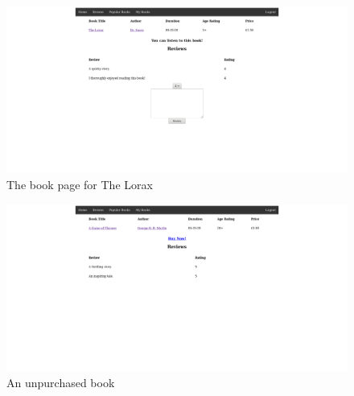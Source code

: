 \documentclass{article}
\begin{document}
\begin{figure}[!htb]
  \caption{The book page for The Lorax}
  \center
  \includegraphics[scale=0.19]{image/book.png}
\end{figure}

\begin{figure}[!htb]
  \caption{An unpurchased book}
  \center
  \includegraphics[scale=0.19]{image/book_b.png}
\end{figure}
\end{document}
